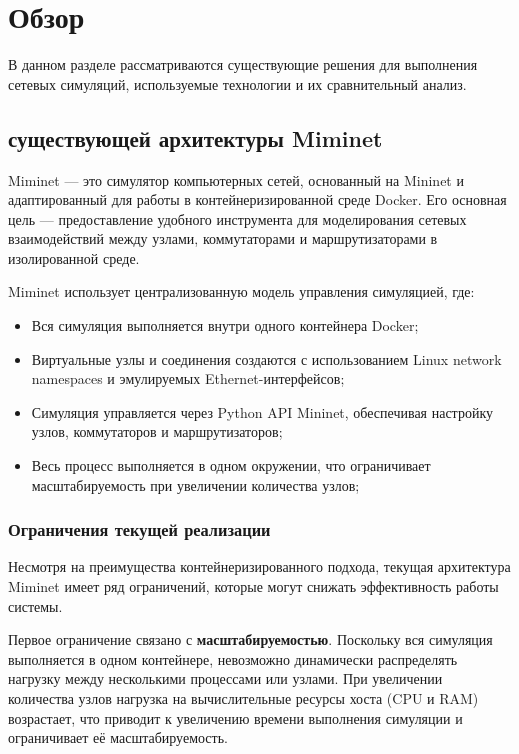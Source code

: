 
\section{Обзор}
\label{sec:relatedworks}

В данном разделе рассматриваются существующие решения для выполнения сетевых симуляций, используемые технологии и их сравнительный анализ.

\subsection{существующей архитектуры Miminet}

Miminet — это симулятор компьютерных сетей, основанный на Mininet и адаптированный для работы в контейнеризированной среде Docker.
Его основная цель — предоставление удобного инструмента для моделирования сетевых взаимодействий между узлами, коммутаторами и маршрутизаторами в изолированной среде.

Miminet использует централизованную модель управления симуляцией, где:
\begin{itemize}
    \item Вся симуляция выполняется внутри одного контейнера Docker;
    \item Виртуальные узлы и соединения создаются с использованием Linux network namespaces и эмулируемых Ethernet-интерфейсов;
    \item Симуляция управляется через Python\cite{python} API Mininet, обеспечивая настройку узлов, коммутаторов и маршрутизаторов;
    \item Весь процесс выполняется в одном окружении, что ограничивает масштабируемость при увеличении количества узлов;
\end{itemize}

\subsubsection{Ограничения текущей реализации}

Несмотря на преимущества контейнеризированного подхода, текущая архитектура Miminet имеет ряд ограничений, которые могут снижать эффективность работы системы.

Первое ограничение связано с \textbf{масштабируемостью}. Поскольку вся симуляция выполняется в одном контейнере, невозможно динамически распределять нагрузку между несколькими процессами или узлами. При увеличении количества узлов нагрузка на вычислительные ресурсы хоста (CPU и RAM) возрастает, что приводит к увеличению времени выполнения симуляции и ограничивает её масштабируемость.

